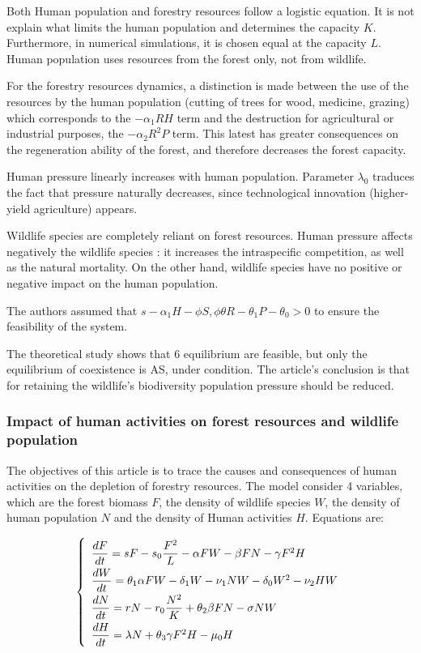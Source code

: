 \documentclass{article}
\begin{document}
Both Human population and forestry resources follow a logistic equation. It is not explain what limits the human population and determines the capacity $K$. Furthermore, in numerical simulations, it is chosen equal at the capacity $L$. Human population uses resources from the forest only, not from wildlife.

For the forestry resources dynamics, a distinction is made between the use of the resources by the human population (cutting of trees for wood, medicine, grazing) which corresponds to the $-\alpha_1 RH$ term and the destruction for agricultural or industrial purposes, the $-\alpha_2 R^2P$ term. This latest has greater consequences on the regeneration ability of the forest, and therefore decreases the forest capacity.

Human pressure linearly increases with human population. Parameter $\lambda_0$ traduces the fact that pressure naturally decreases, since technological innovation (higher-yield agriculture) appears.


Wildlife species are completely reliant on forest resources. Human pressure affects negatively the wildlife species : it increases the intraspecific competition, as well as the natural mortality. On the other hand, wildlife species have no positive or negative impact on the human population.

The authors assumed that $s - \alpha_1 H - \phi S, \phi \theta R - \theta_1 P - \theta_0 > 0$ to ensure the feasibility of the system.

The theoretical study shows that 6 equilibrium are feasible, but only the equilibrium of coexistence is AS, under condition. The article's conclusion is that for retaining the wildlife's biodiversity population pressure should be reduced.



\subsubsection{Impact of human activities on forest resources and wildlife population \cite{pathak_impact_2021}}

The objectives of this article is to trace the causes and consequences of human activities on the depletion of forestry resources. The model consider 4 variables, which are the forest biomass $F$, the density of wildlife species $W$, the density of human population $N$ and the density of Human activities $H$. Equations are:

\begin{equation}
\def\arraystretch{2}
\left\lbrace \begin{array}{l}
\dfrac{dF}{dt} =  sF -s_0 \dfrac{F^2}{L} - \alpha FW - \beta FN - \gamma F^2H\\
\dfrac{dW}{dt} = \theta_1 \alpha FW - \delta_1 W - \nu_1 NW - \delta_0 W^2 - \nu_2 HW\\
\dfrac{dN}{dt} = rN - r_0 \dfrac{N^2}{K} + \theta_2 \beta FN - \sigma NW \\
\dfrac{dH}{dt} = \lambda N + \theta_3 \gamma F^2 H - \mu_0 H
\end{array} \right.
\end{equation}
\end{document}
